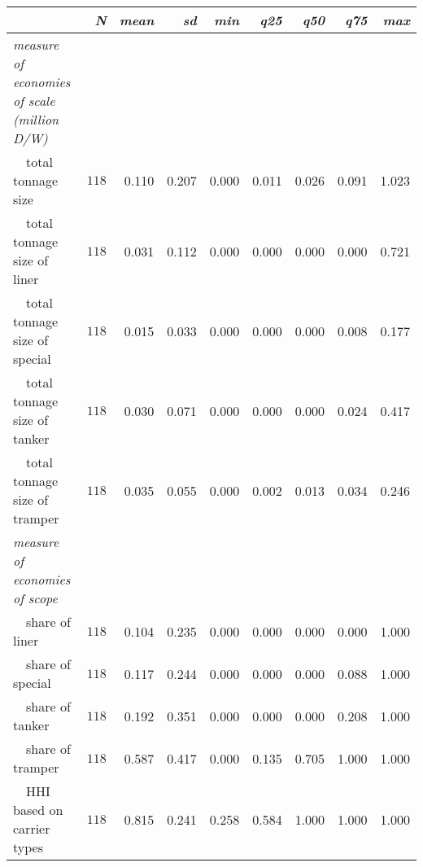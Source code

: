 \begin{tabular}{lrrrrrrrr}
\toprule
\multicolumn{1}{l}{\itshape }&\multicolumn{1}{r}{\itshape N}&\multicolumn{1}{r}{\itshape mean}&\multicolumn{1}{r}{\itshape sd}&\multicolumn{1}{r}{\itshape min}&\multicolumn{1}{r}{\itshape q25}&\multicolumn{1}{r}{\itshape q50}&\multicolumn{1}{r}{\itshape q75}&\multicolumn{1}{r}{\itshape max}\tabularnewline
\midrule
{\itshape measure of economies of scale (million D/W)}&&&&&&&&\tabularnewline
~~total tonnage size&$118$&0.110&0.207&0.000&0.011&0.026&0.091&1.023\tabularnewline
~~total tonnage size of liner&$118$&0.031&0.112&0.000&0.000&0.000&0.000&0.721\tabularnewline
~~total tonnage size of special&$118$&0.015&0.033&0.000&0.000&0.000&0.008&0.177\tabularnewline
~~total tonnage size of tanker&$118$&0.030&0.071&0.000&0.000&0.000&0.024&0.417\tabularnewline
~~total tonnage size of tramper&$118$&0.035&0.055&0.000&0.002&0.013&0.034&0.246\tabularnewline
\midrule
{\itshape measure of economies of scope}&&&&&&&&\tabularnewline
~~share of liner&$118$&0.104&0.235&0.000&0.000&0.000&0.000&1.000\tabularnewline
~~share of special&$118$&0.117&0.244&0.000&0.000&0.000&0.088&1.000\tabularnewline
~~share of tanker&$118$&0.192&0.351&0.000&0.000&0.000&0.208&1.000\tabularnewline
~~share of tramper&$118$&0.587&0.417&0.000&0.135&0.705&1.000&1.000\tabularnewline
~~HHI based on carrier types&$118$&0.815&0.241&0.258&0.584&1.000&1.000&1.000\tabularnewline
\bottomrule
\end{tabular}

